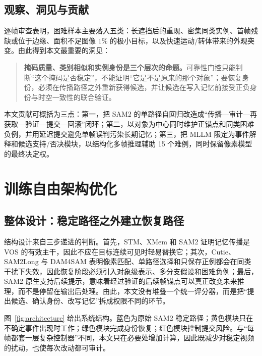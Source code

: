 \documentclass[11pt,a4paper,oneside]{ctexart}
\begin{document}
\subsection{观察、洞见与贡献}
逐帧审查表明，困难样本主要落入五类：长遮挡后的重现、密集同类实例、首帧残缺或位于边缘、面积不足图像 $1\%$ 的极小目标，以及快速运动/转体带来的外观突变。由此得到本文最重要的洞见：
\begin{quote}
\small\textbf{掩码质量、类别相似和实例身份是三个层次的命题。}可靠性门控只能判断“这个掩码是否稳定”，不能证明“它是不是原来的那个对象”；要恢复身份，必须在传播路径之外重新获得候选，并让候选在写入记忆前接受正负身份与时空一致性的联合验证。
\end{quote}
本文贡献可概括为三点：第一，把 SAM2 的单路径自回归改造成“传播—审计—再获取—验证—提交—回滚”闭环；第二，以对象为中心同时维护正锚点和同类困难负例，并用延迟提交避免单帧误判污染长期记忆；第三，把 MLLM 限定为事件解释和候选支持/否决模块，以结构化多帧推理辅助 15 个难例，同时保留像素模型的最终决定权。

\section{训练自由架构优化}

\subsection{整体设计：稳定路径之外建立恢复路径}
结构设计来自三步递进的判断。首先，STM、XMem 和 SAM2 证明记忆传播是 VOS 的有效主干，因此不应在目标连续可见时轻易替换它；其次，Cutie、SAM2Long 与 DAM4SAM 表明像素匹配、单路径选择和只保存正例都会在同类干扰下失效，因此恢复阶段必须引入对象级表示、多分支假设和困难负例；最后，SAM2 原生支持后续提示，意味着经过验证的后续帧锚点可以真正改变未来推理，而不是停留在输出后处理。由此，本文没有堆叠一个统一评分器，而是把“提出候选、确认身份、改写记忆”拆成权限不同的环节。

图~\ref{fig:architecture} 给出系统结构。蓝色为原始 SAM2 稳定路径；黄色模块只在不确定事件出现时工作；绿色模块完成身份恢复；红色模块控制提交风险。与“每帧都套一层复杂控制器”不同，本文只在必要处增加计算，因此既减少对稳定视频的扰动，也使每次改动都可审计。
\end{document}
